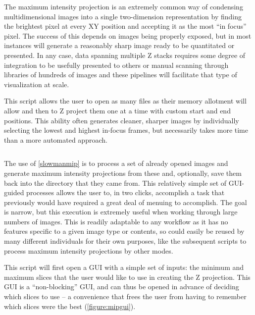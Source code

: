 The maximum intensity projection is an extremely common way of condensing multidimensional images into a single two-dimension representation by finding the brightest pixel at every XY position and accepting it as the most ``in focus'' pixel. The success of this depends on images being properly exposed, but in most instances will generate a reasonably sharp image ready to be quantitated or presented. In any case, data spanning multiple Z stacks requires some degree of integration to be usefully presented to others or manual scanning through libraries of hundreds of images and these pipelines will facilitate that type of visualization at scale.

\begin{code}
\caption{This script allows the user to open as many files as their memory allotment will allow and then to Z project them one at a time with custom start and end positions. This ability often generates cleaner, sharper images by individually selecting the lowest and highest in-focus frames, but necessarily takes more time than a more automated approach.}
\label{slowmanmip}

\inputminted[breaklines,frame=single,fontsize=\small]{python}{source/manMIPper.py}

\end{code}

The use of \autoref{slowmanmip} is to process a set of already opened images and generate maximum intensity projections from these and, optionally, save them back into the directory that they came from. This relatively simple set of GUI-guided processes allows the user to, in two clicks, accomplish a task that previously would have required a great deal of menuing to accomplish. The goal is narrow, but this execution is extremely useful when working through large numbers of images. This is readily adaptable to any workflow as it has no features specific to a given image type or contents, so could easily be reused by many different individuals for their own purposes, like the subsequent scripts to process maximum intensity projections by other modes.

This script will first open a GUI with a simple set of inputs: the minimum and maximum slices that the user would like to use in creating the Z projection. This GUI is a ``non-blocking'' GUI, and can thus be opened in advance of deciding which slices to use -- a convenience that frees the user from having to remember which slices were the best (\autoref{figure:mipgui}). 

